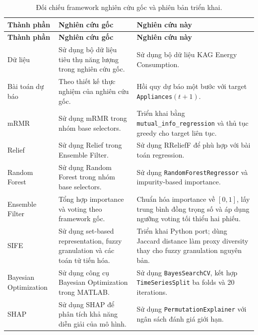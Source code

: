 \small
\begin{longtable}{
    @{}
    >{\raggedright\arraybackslash}p{}
    >{\raggedright\arraybackslash}p{}
    >{\raggedright\arraybackslash}p{}
    @{}
}
\caption{Đối chiếu framework nghiên cứu gốc và phiên bản triển khai.}
\label{tab:framework-comparison}\\

\toprule
\textbf{Thành phần}
&
\textbf{Nghiên cứu gốc}
&
\textbf{Nghiên cứu này}
\\
\midrule
\endfirsthead

\toprule
\textbf{Thành phần}
&
\textbf{Nghiên cứu gốc}
&
\textbf{Nghiên cứu này}
\\
\midrule
\endhead

\bottomrule
\endlastfoot

Dữ liệu
&
Sử dụng bộ dữ liệu tiêu thụ năng lượng trong nghiên cứu gốc.
&
Sử dụng bộ dữ liệu KAG Energy Consumption.
\\

Bài toán dự báo
&
Theo thiết kế thực nghiệm của nghiên cứu gốc.
&
Hồi quy dự báo một bước với target
\texttt{Appliances}$(t+1)$.
\\

mRMR
&
Sử dụng mRMR trong nhóm base selectors.
&
Triển khai bằng \texttt{mutual\_info\_regression}
và thủ tục greedy cho target liên tục.
\\

Relief
&
Sử dụng Relief trong Ensemble Filter.
&
Sử dụng RReliefF để phù hợp với bài toán regression.
\\

Random Forest
&
Sử dụng Random Forest trong nhóm base selectors.
&
Sử dụng \texttt{RandomForestRegressor} và
impurity-based importance.
\\

Ensemble Filter
&
Tổng hợp importance và voting theo framework gốc.
&
Chuẩn hóa importance về $[0,1]$, lấy trung bình đồng trọng số
và áp dụng ngưỡng voting tối thiểu hai phiếu.
\\

SIFE
&
Sử dụng set-based representation, fuzzy granulation
và các toán tử tiến hóa.
&
Triển khai Python port; dùng Jaccard distance làm proxy
diversity thay cho fuzzy granulation nguyên bản.
\\

Bayesian Optimization
&
Sử dụng công cụ Bayesian Optimization trong MATLAB.
&
Sử dụng \texttt{BayesSearchCV}, kết hợp
\texttt{TimeSeriesSplit} ba folds và 20 iterations.
\\

SHAP
&
Sử dụng SHAP để phân tích khả năng diễn giải của mô hình.
&
Sử dụng \texttt{PermutationExplainer} với ngân sách đánh giá
giới hạn.
\\

\end{longtable}
\normalsize

